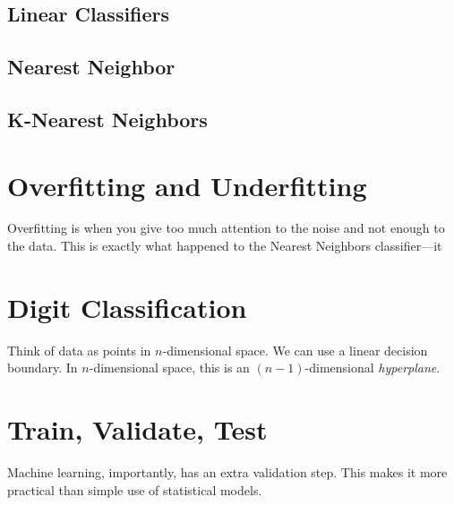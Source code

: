 \subsection{Linear Classifiers}

\subsection{Nearest Neighbor}

\subsection{K-Nearest Neighbors}

\section{Overfitting and Underfitting}
Overfitting is when you give too much attention to the noise and not enough to the data.
This is exactly what happened to the Nearest Neighbors classifier---it 

\section{Digit Classification}
Think of data as points in $n$-dimensional space.
We can use a linear decision boundary.
In $n$-dimensional space, this is an $(n-1)$-dimensional \textit{hyperplane}.

\section{Train, Validate, Test}
Machine learning, importantly, has an extra validation step.
This makes it more practical than simple use of statistical models.


